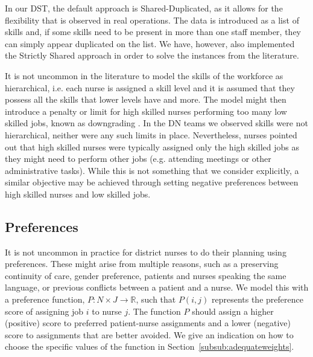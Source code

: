 \documentclass[a4paper,11pt,authoryear]{elsarticle}
\begin{document}
\noindent In our DST, the default approach is Shared-Duplicated, as it allows for the flexibility that is observed in real operations. The data is introduced as a list of skills and, if some skills need to be present in more than one staff member, they can simply appear duplicated on the list. We have, however, also implemented the Strictly Shared approach in order to solve the instances from the literature.

It is not uncommon in the literature to model the skills of the workforce as hierarchical, i.e. each nurse is assigned a skill level and it is assumed that they possess all the skills that lower levels have and more. The model might then introduce a penalty or limit for high skilled nurses performing too many low skilled jobs, known as downgrading \cite[see, for example,][]{fikar2015}. In the DN teams we observed skills were not hierarchical, neither were any such limits in place. Nevertheless, nurses pointed out that high skilled nurses were typically assigned only the high skilled jobs as they might need to perform other jobs (e.g. attending meetings or other administrative tasks). While this is not something that we consider explicitly, a similar objective may be achieved through setting negative preferences between high skilled nurses and low skilled jobs.

\subsection{Preferences}
\label{sub:preferences}
\noindent It is not uncommon in practice for district nurses to do their planning using preferences. These might arise from multiple reasons, such as a preserving continuity of care, gender preference, patients and nurses speaking the same language, or previous conflicts between a patient and a nurse. We model this with a preference function, $P: N\times J \rightarrow \mathbb{R}$, such that $P(i,j)$ represents the preference score of assigning job $i$ to nurse $j$. The function $P$ should assign a higher (positive) score to preferred patient-nurse assignments and a lower (negative) score to assignments that are better avoided. We give an indication on how to choose the specific values of the function in Section~\ref{subsub:adequateweights}.

\end{document}
